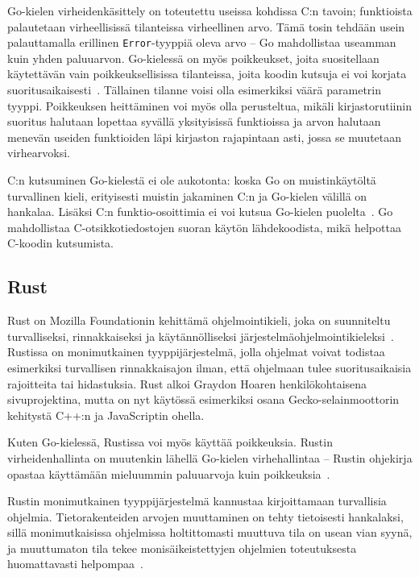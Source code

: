 Go-kielen virheidenkäsittely on toteutettu useissa kohdissa C:n tavoin;
funktioista palautetaan virheellisissä tilanteissa virheellinen arvo. Tämä
tosin tehdään usein palauttamalla erillinen \texttt{Error}-tyyppiä oleva arvo
-- Go mahdollistaa useamman kuin yhden paluuarvon. Go-kielessä on myös
poikkeukset, joita suositellaan käytettävän vain poikkeuksellisissa
tilanteissa, joita koodin kutsuja ei voi korjata
suoritusaikaisesti~\citep{effectivego}. Tällainen tilanne voisi olla esimerkiksi
väärä parametrin tyyppi. Poikkeuksen heittäminen voi myös olla perusteltua,
mikäli kirjastorutiinin suoritus halutaan lopettaa syvällä yksityisissä
funktioissa ja arvon halutaan menevän useiden funktioiden läpi kirjaston
rajapintaan asti, jossa se muutetaan virhearvoksi.

C:n kutsuminen Go-kielestä ei ole aukotonta: koska Go on muistinkäytöltä
turvallinen kieli, erityisesti muistin jakaminen C:n ja Go-kielen välillä on
hankalaa. Lisäksi C:n funktio-osoittimia ei voi kutsua Go-kielen
puolelta~\citep{cgo}. Go mahdollistaa C-otsikkotiedostojen suoran käytön
lähdekoodista, mikä helpottaa C-koodin kutsumista.

\subsection{Rust}

Rust on Mozilla Foundationin kehittämä ohjelmointikieli, joka on suunniteltu
turvalliseksi, rinnakkaiseksi ja käytännölliseksi
järjestelmäohjelmointikieleksi~\citep{rustfaq}. Rustissa on monimutkainen
tyyppijärjestelmä, jolla ohjelmat voivat todistaa esimerkiksi turvallisen
rinnakkaisajon ilman, että ohjelmaan tulee suoritusaikaisia rajoitteita tai
hidastuksia. Rust alkoi Graydon Hoaren henkilökohtaisena sivuprojektina, mutta
on nyt käytössä esimerkiksi osana Gecko-se\-lain\-moot\-to\-rin kehitystä C++:n ja
JavaScriptin ohella.

Kuten Go-kielessä, Rustissa voi myös käyttää poikkeuksia. Rustin
virheidenhallinta on muutenkin lähellä Go-kielen virhehallintaa -- Rustin
ohjekirja opastaa käyttämään mieluummin paluuarvoja kuin
poikkeuksia~\citep{rusterrorhandling}.

Rustin monimutkainen tyyppijärjestelmä kannustaa kirjoittamaan turvallisia
ohjelmia. Tietorakenteiden arvojen muuttaminen on tehty tietoisesti hankalaksi,
sillä monimutkaisissa ohjelmissa holtittomasti muuttuva tila on usean vian
syynä, ja muuttumaton tila tekee monisäikeistettyjen
ohjelmien toteutuksesta huomattavasti helpompaa~\citep[luku 4, kohta
17]{effectivejava}.

